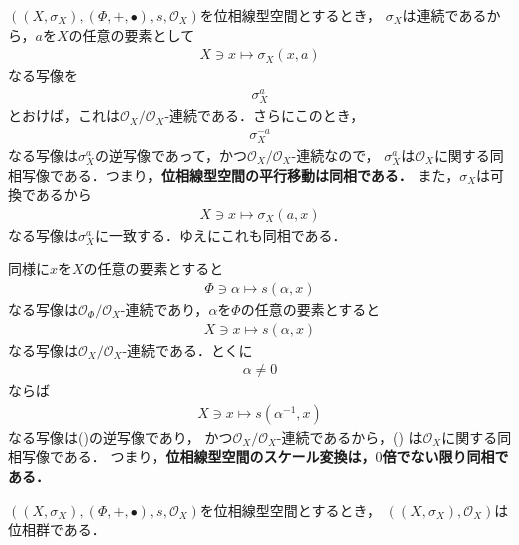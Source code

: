 	$\left(\left(X,\sigma_X\right),(\Phi,+,\bullet),s,\mathscr{O}_X\right)$を位相線型空間とするとき，
	$\sigma_X$は連続であるから，$a$を$X$の任意の要素として
	\begin{align}
		X \ni x \longmapsto \sigma_X(x,a)
	\end{align}
	なる写像を
	\begin{align}
		\sigma_X^a
	\end{align}
	とおけば，これは$\mathscr{O}_X/\mathscr{O}_X$-連続である．さらにこのとき，
	\begin{align}
		\sigma_X^{-a}
	\end{align}
	なる写像は$\sigma_X^a$の逆写像であって，かつ$\mathscr{O}_X/\mathscr{O}_X$-連続なので，
	$\sigma_X^a$は$\mathscr{O}_X$に関する同相写像である．つまり，{\bf 位相線型空間の平行移動は同相である．}
	また，$\sigma_X$は可換であるから
	\begin{align}
		X \ni x \longmapsto \sigma_X(a,x)
	\end{align}
	なる写像は$\sigma_X^a$に一致する．ゆえにこれも同相である．
	
	同様に$x$を$X$の任意の要素とすると
	\begin{align}
		\Phi \ni \alpha \longmapsto s(\alpha,x)
	\end{align}
	なる写像は$\mathscr{O}_\Phi/\mathscr{O}_X$-連続であり，$\alpha$を$\Phi$の任意の要素とすると
	\begin{align}
		X \ni x \longmapsto s(\alpha,x)
		\label{partial_continuity_of_summation_of_topological_vector_spaces_1}
	\end{align}
	なる写像は$\mathscr{O}_X/\mathscr{O}_X$-連続である．とくに
	\begin{align}
		\alpha \neq 0
	\end{align}
	ならば
	\begin{align}
		X \ni x \longmapsto s(\alpha^{-1},x)
	\end{align}
	なる写像は()の逆写像であり，
	かつ$\mathscr{O}_X/\mathscr{O}_X$-連続であるから，()
	は$\mathscr{O}_X$に関する同相写像である．
	つまり，{\bf 位相線型空間のスケール変換は，$0$倍でない限り同相である．}
	
	\begin{screen}
		\begin{thm}[位相線型空間は位相群]\label{thm:topological_vector_space_is_topological_group}
			$\left(\left(X,\sigma_X\right),(\Phi,+,\bullet),s,\mathscr{O}_X\right)$を位相線型空間とするとき，
			$\left(\left(X,\sigma_X\right),\mathscr{O}_X\right)$は位相群である．
		\end{thm}
	\end{screen}
	
